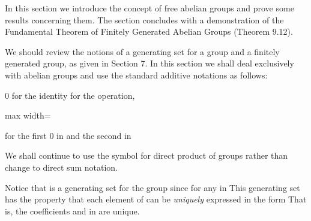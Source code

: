 \documentclass[11pt,oneside]{article}
\begin{document}
\fi
\renewcommand{\BookFooter}{Section 19 Free Abelian Groups}
\ifdefined\BookMaster\else\setcounter{page}{166}\fi
\BookNarrativetrue

\begin{BookBody}


\noindent In this section we introduce the concept of free abelian groups and prove some results concerning them. The section concludes with a demonstration of the Fundamental Theorem of Finitely Generated Abelian Groups (Theorem 9.12).


\noindent We should review the notions of a generating set for a group  and a finitely generated group, as given in Section 7. In this section we shall deal exclusively with abelian groups and use the standard additive notations as follows:

0 for the identity\BookInline{,\allowbreak + } for the operation,

\begin{center}\begin{adjustbox}{max width=\linewidth}\end{adjustbox}\end{center}

 for the first 0 in  and the second in 

\noindent We shall continue to use the symbol \BookInline{\times } for direct product of groups rather than change to direct sum notation.

Notice that  is a generating set for the group  since  for any  in  This generating set has the property that each element of  can be\textit{ uniquely} expressed in the form  That is, the coefficients  and  in  are unique.


\end{BookBody}
\end{document}
